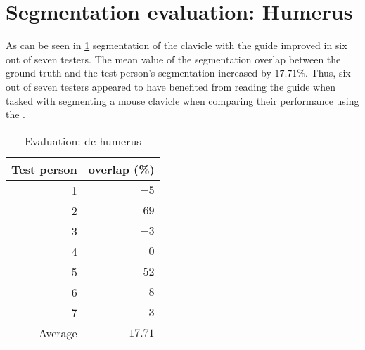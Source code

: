 \section{Segmentation evaluation: Humerus}\label{s:seg-eval-humerus}
As can be seen in \cref{tab:humerus-overlap} segmentation of the clavicle with the guide improved in six out of seven testers.
The mean value of the segmentation overlap between the ground truth and the test person's segmentation increased by $17.71\%$.
Thus, six out of seven testers appeared to have benefited from reading the guide when tasked with segmenting a mouse 
clavicle when comparing their performance using the .
\begin{table}[ht]
	\begin{center}
		\begin{tabular}{r r}
			\textbf{Test person} & \textbf{overlap (\%)} \\
			\hline
			1                    & $-5$                  \\
			2                    & $69$                  \\
			3                    & $-3$                  \\
			4                    & $0$                   \\
			5                    & $52$                  \\
			6                    & $8$                   \\
			7                    & $3$                   \\
			\hline
			Average              & $17.71$               \\
		\end{tabular}
		\caption{Evaluation: \acrshort{dc} humerus}\label{tab:humerus-overlap}
	\end{center}
\end{table}

